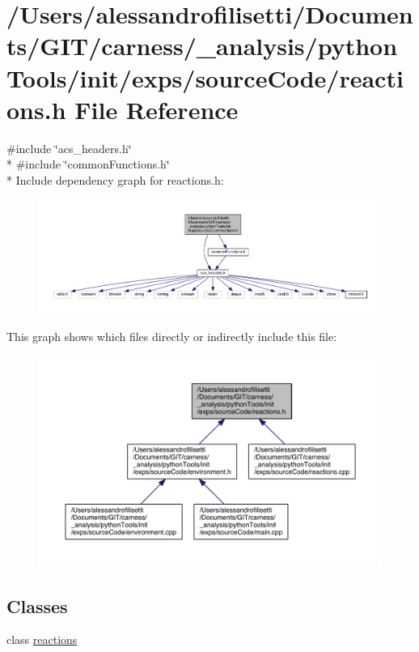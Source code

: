 \hypertarget{a00076}{\section{/\+Users/alessandrofilisetti/\+Documents/\+G\+I\+T/carness/\+\_\+analysis/python\+Tools/init/exps/source\+Code/reactions.h File Reference}
\label{a00076}
}
{\ttfamily \#include \char`\"{}acs\+\_\+headers.\+h\char`\"{}}\\*
{\ttfamily \#include \char`\"{}common\+Functions.\+h\char`\"{}}\\*
Include dependency graph for reactions.\+h\+:\nopagebreak
\begin{figure}[H]
\begin{center}
\leavevmode
\includegraphics[width=350pt]{a00198}
\end{center}
\end{figure}
This graph shows which files directly or indirectly include this file\+:\nopagebreak
\begin{figure}[H]
\begin{center}
\leavevmode
\includegraphics[width=350pt]{a00199}
\end{center}
\end{figure}
\subsection*{Classes}
\begin{DoxyCompactItemize}
\item 
class \hyperlink{a00020}{reactions}
\end{DoxyCompactItemize}

